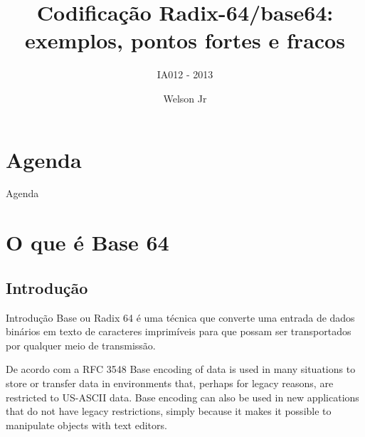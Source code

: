 \documentclass[pdf]{beamer}
\author{Welson Jr}
\title{Codificação Radix-64/base64: exemplos, pontos fortes e fracos}
\subtitle{IA012 - 2013}
\begin{document}
\begin{frame}
\transdissolve
\maketitle
\end{frame}
\section{Agenda}
\begin{frame}{Agenda}
\transdissolve
	\tableofcontents
\end{frame}

\AtBeginSection[]
{
\begin{frame}
	\tableofcontents[currentsection]
\end{frame}
}

\section{O que é Base 64}
\subsection{Introdução}
\begin{frame}{Introdução}
\transdissolve
Base ou Radix 64 é uma técnica que converte uma entrada de dados binários em texto de caracteres imprimíveis para que possam ser transportados por qualquer meio de transmissão.
\pause
\begin{block}{De acordo com a RFC 3548}
Base encoding of data is used in many situations to store or transfer data in environments that, perhaps for legacy reasons, are restricted to US-ASCII data.  Base encoding can also be used in new applications that do not have legacy restrictions, simply because it makes it possible to manipulate objects with text editors.
\end{block}
\end{frame}
\end{document}
